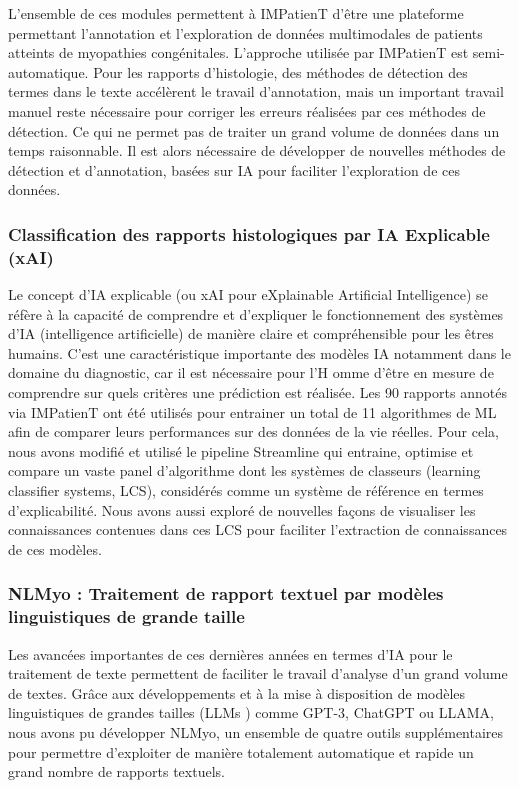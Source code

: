 L’ensemble de ces modules permettent à IMPatienT d’être une plateforme permettant l’annotation et l’exploration de données multimodales de patients atteints de myopathies congénitales. L’approche utilisée par IMPatienT est semi-automatique. Pour les rapports d’histologie, des méthodes de détection des termes dans le texte accélèrent le travail d’annotation, mais un important travail manuel reste nécessaire pour corriger les erreurs réalisées par ces méthodes de détection. Ce qui ne permet pas de traiter un grand volume de données dans un temps raisonnable. Il est alors nécessaire de développer de nouvelles méthodes de détection et d’annotation, basées sur IA pour faciliter l’exploration de ces données.

\subsubsection{Classification des rapports histologiques par IA Explicable (xAI)}

Le concept d’IA explicable (ou xAI pour eXplainable Artificial Intelligence) se réfère à la capacité de comprendre et d’expliquer le fonctionnement des systèmes d’IA (intelligence artificielle) de manière claire et compréhensible pour les êtres humains. C’est une caractéristique importante des modèles IA notamment dans le domaine du diagnostic, car il est nécessaire pour l’H omme d’être en mesure de comprendre sur quels critères une prédiction est réalisée. Les 90 rapports annotés via IMPatienT ont été utilisés pour entrainer un total de 11 algorithmes de ML afin de comparer leurs performances sur des données de la vie réelles. Pour cela, nous avons modifié et utilisé le pipeline Streamline qui entraine, optimise et compare un vaste panel d’algorithme dont les systèmes de classeurs (learning classifier systems, LCS),  considérés comme un système de référence en termes d’explicabilité. Nous avons aussi exploré de nouvelles façons de visualiser les connaissances contenues dans ces LCS pour faciliter l’extraction de connaissances de ces modèles.

\subsubsection{NLMyo : Traitement de rapport textuel par modèles linguistiques de grande taille}

Les avancées importantes de ces dernières années en termes d’IA pour le traitement de texte permettent de faciliter le travail d’analyse d’un grand volume de textes. Grâce aux développements et à la mise à disposition de modèles linguistiques de grandes tailles (LLMs ) comme GPT-3, ChatGPT ou LLAMA, nous avons pu développer NLMyo, un ensemble de quatre outils supplémentaires pour permettre d’exploiter de manière totalement automatique et rapide un grand nombre de rapports textuels.

